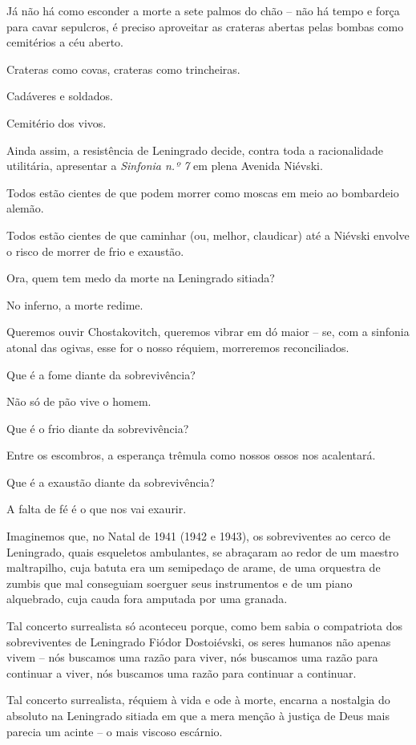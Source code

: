 Já não há como esconder a morte a sete palmos do chão -- não há tempo e
força para cavar sepulcros, é preciso aproveitar as crateras abertas
pelas bombas como cemitérios a céu aberto.

Crateras como covas, crateras como trincheiras.

Cadáveres e soldados.

Cemitério dos vivos.

Ainda assim, a resistência de Leningrado decide, contra toda a
racionalidade utilitária, apresentar a \emph{Sinfonia n.º 7} em plena
Avenida Niévski.

Todos estão cientes de que podem morrer como moscas em meio ao
bombardeio alemão.

Todos estão cientes de que caminhar (ou, melhor, claudicar) até a
Niévski envolve o risco de morrer de frio e exaustão.

Ora, quem tem medo da morte na Leningrado sitiada?

No inferno, a morte redime.

Queremos ouvir Chostakovitch, queremos vibrar em dó maior -- se, com a
sinfonia atonal das ogivas, esse for o nosso réquiem, morreremos
reconciliados.

Que é a fome diante da sobrevivência?

Não só de pão vive o homem.

Que é o frio diante da sobrevivência?

Entre os escombros, a esperança trêmula como nossos ossos nos
acalentará.

Que é a exaustão diante da sobrevivência?

A falta de fé é o que nos vai exaurir.

Imaginemos que, no Natal de 1941 (1942 e 1943), os sobreviventes ao
cerco de Leningrado, quais esqueletos ambulantes, se abraçaram ao redor
de um maestro maltrapilho, cuja batuta era um semipedaço de arame, de
uma orquestra de zumbis que mal conseguiam soerguer seus instrumentos e
de um piano alquebrado, cuja cauda fora amputada por uma granada.

Tal concerto surrealista só aconteceu porque, como bem sabia o
compatriota dos sobreviventes de Leningrado Fiódor Dostoiévski, os seres
humanos não apenas vivem -- nós buscamos uma razão para viver, nós
buscamos uma razão para continuar a viver, nós buscamos uma razão para
continuar a continuar.

Tal concerto surrealista, réquiem à vida e ode à morte, encarna a
nostalgia do absoluto na Leningrado sitiada em que a mera menção à
justiça de Deus mais parecia um acinte -- o mais viscoso escárnio.


